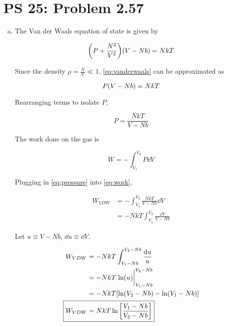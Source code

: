 \documentclass[12pt,a4paper,twocolumn]{article}
\begin{document}
\setcounter{page}{1}

\section*{PS 25: Problem 2.57}
\bigskip

\begin{enumerate}[(a)]

\item The Van der Waals equation of state is given by

\begin{equation}\label{eq:vanderwaals}
	\qty(P + \frac{N^2}{V^2})\qty(V-Nb) = NkT
\end{equation}

Since the density $\rho = \frac{N}{V} \ll 1$, \eqref{eq:vanderwaals} can be approximated as

\begin{equation}\label{eq:vdwapprox}
	P\qty(V-Nb) = NkT
\end{equation}

Rearranging terms to isolate $P$,

\begin{equation}\label{eq:pressure}
	P = \frac{NkT}{V-Nb}
\end{equation}

The work done on the gas is

\begin{equation}\label{eq:work}
	W = -\int_{V_1}^{V_2} P \dd{V}
\end{equation}

Plugging in \eqref{eq:pressure} into \eqref{eq:work},

\begin{align}
	W_{VDW} &= -\int_{V_1}^{V_2} \frac{NkT}{V-Nb} \dd{V} \nonumber \\
	&= -NkT \int_{V_1}^{V_2} \frac{\dd{V}}{V-Nb}
\end{align}

Let $u \equiv V - Nb$, $\dd{u} \equiv \dd{V}$.

\begin{align}
	W_{VDW} &= -NkT \int_{V_1-Nb}^{V_2-Nb} \frac{\dd{u}}{u} \nonumber \\
	&= -NkT \eval{\ln(u)}_{V_1-Nb}^{V_2-Nb} \nonumber \\
	&= -NkT \qty[\ln(V_2-Nb) - \ln(V_1-Nb)] \nonumber \\
	\Aboxed{
		W_{VDW} &= NkT \ln\qty[\frac{V_1-Nb}{V_2-Nb}] \label{eq:answer-a}
	}
\end{align}



\end{enumerate}
\end{document}
